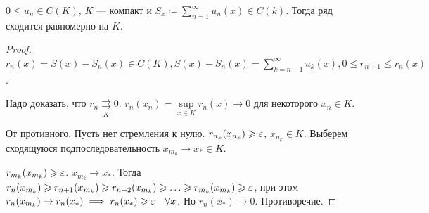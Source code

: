 \begin{theorem}
    $0 \le u_n \in C(K)$, $K$ --- компакт и  $S_x \coloneqq \sum\limits_{n=1}^\infty u_n(x) \in C(k)$. Тогда ряд сходится равномерно на  $K$.
\end{theorem}
\begin{proof}
    $r_n(x) = S(x) - S_n(x) \in C(K), S(x) - S_n(x) = \sum\limits_{k=n+1}^\infty u_k(x), 0 \le r_{n+1} \le r_n(x)$.

    Надо доказать, что $r_n \underset{K}{\rightrightarrows} 0$.  $r_n(x_n) = \sup\limits_{x \in K} r_n(x) \to 0$ для некоторого $x_n \in K$.

    От противного. Пусть нет стремления к нулю.  $r_{n_k}(x_{n_k}) \geqslant \varepsilon$, $x_{n_k} \in K$. Выберем сходящуюся подпоследовательность  $x_{m_k} \to x_* \in K$.

     $r_{m_k}(x_{m_k}) \geqslant \varepsilon$. $x_{m_k} \to x_*$. Тогда  $r_n(x_{m_k}) \geqslant r_{n+1}(x_{m_k}) \geqslant r_{n+2}(x_{m_k}) \geqslant \ldots \geqslant r_{m_k}(x_{m_k}) \geqslant \varepsilon$, при этом $r_n(x_{m_k}) \to r_n(x_*) \implies r_n(x_*) \geqslant \varepsilon \quad \forall x$. Но $r_n(x_*) \to 0$. Противоречие.
\end{proof}
